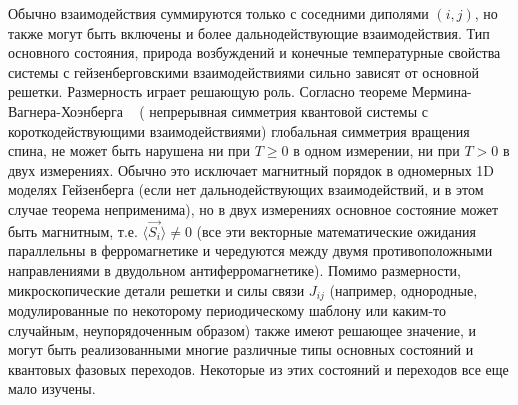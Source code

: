 \documentclass[11pt]{article}
\begin{document}
Обычно взаимодействия суммируются только с соседними диполями $(i,j)$, но также могут быть включены и более дальнодействующие взаимодействия. Тип основного состояния, природа возбуждений и конечные температурные свойства системы с гейзенберговскими взаимодействиями сильно зависят от основной решетки. Размерность играет решающую роль. Согласно теореме Мермина-Вагнера-Хоэнберга ~\cite{prl_17_1133, pr_158_383} ( непрерывная симметрия квантовой системы с короткодействующими взаимодействиями) глобальная симметрия вращения спина, не может быть нарушена ни при $T ≥ 0$ в одном измерении, ни при $T> 0$ в двух измерениях. Обычно это исключает магнитный порядок в одномерных 1D моделях Гейзенберга (если нет дальнодействующих взаимодействий, и в этом случае теорема неприменима), но в двух измерениях основное состояние может быть магнитным, т.е. $\langle \vec{S_i} \rangle \ne 0$ (все эти векторные математические ожидания параллельны в ферромагнетике и чередуются между двумя противоположными направлениями в двудольном антиферромагнетике). Помимо размерности, микроскопические детали решетки и силы связи $J _{ij}$ (например, однородные, модулированные по некоторому периодическому шаблону или каким-то случайным, неупорядоченным образом) также имеют решающее значение, и могут быть реализованными многие различные типы основных состояний и квантовых фазовых переходов. Некоторые из этих состояний и переходов все еще мало изучены.
\end{document}

